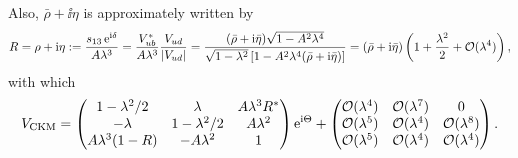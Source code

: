 \documentclass[CheatSheet]{subfiles}
\begin{document}
Also, $\bar\rho+\ii\eta$ is approximately written by
\begin{equation}
 R=\rho+\mathrm{i}\eta:=\frac{s_{13}\mathop{}\!\mathrm{e}^{\mathrm{i}\delta}}{A\lambda^3}
=\frac{V^*_{ub}}{A\lambda^3}\frac{V_{ud}}{|V_{ud}|}
= \frac{(\bar\rho+\mathrm{i}\bar\eta)\sqrt{1-A^2\lambda^4}}
        {\sqrt{1-\lambda^2}\left[1-A^2\lambda^4(\bar\rho+\mathrm{i}\bar\eta)\right]}
= \left(\bar\rho+\mathrm{i}\bar\eta\right)\left(1+\frac{\lambda^2}{2}+\operatorname{\mathcal{O}}(\lambda^4)\right),
\end{equation}
with which
\begin{equation}
 V_{\mathrm{CKM}}
=\begin{pmatrix}
 1-\lambda^2/2 & \lambda       & A\lambda^3R^*\\
 -\lambda      & 1-\lambda^2/2 & A\lambda^2\\
 A\lambda^3(1-R) & -A\lambda^2 & 1
\end{pmatrix}\mathop{}\!\mathrm{e}^{\mathrm{i}\Theta}
+\begin{pmatrix}
\operatorname{\mathcal{O}}(\lambda^4) & \operatorname{\mathcal{O}}(\lambda^7) & 0\\
\operatorname{\mathcal{O}}(\lambda^5) & \operatorname{\mathcal{O}}(\lambda^4) & \operatorname{\mathcal{O}}(\lambda^8)\\
\operatorname{\mathcal{O}}(\lambda^5) & \operatorname{\mathcal{O}}(\lambda^4) & \operatorname{\mathcal{O}}(\lambda^4)
\end{pmatrix}.
\end{equation}
\end{document}
